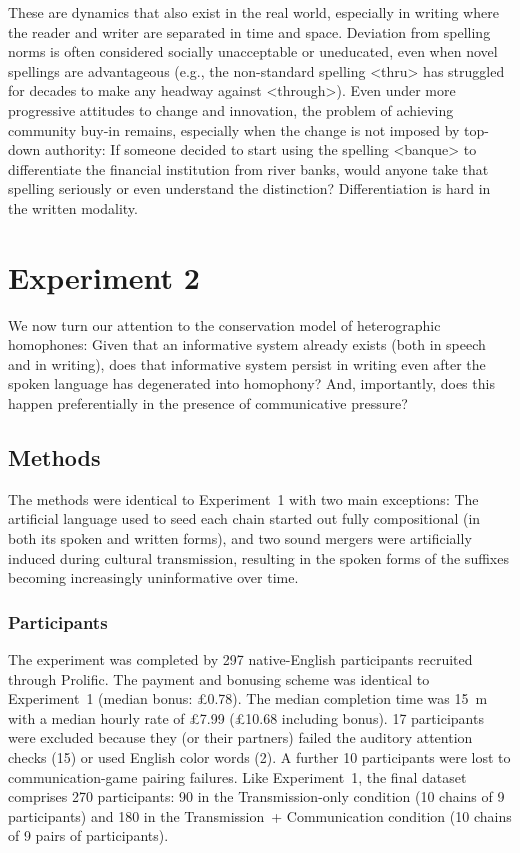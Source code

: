 \documentclass[doc,biblatex]{apa7}
\begin{document}
These are dynamics that also exist in the real world, especially in writing where the reader and writer are separated in time and space. Deviation from spelling norms is often considered socially unacceptable or uneducated, even when novel spellings are advantageous (e.g., the non-standard spelling <thru> has struggled for decades to make any headway against <through>). Even under more progressive attitudes to change and innovation, the problem of achieving community buy-in remains, especially when the change is not imposed by top-down authority: If someone decided to start using the spelling <banque> to differentiate the financial institution from river banks, would anyone take that spelling seriously or even understand the distinction? Differentiation is hard in the written modality.


\section{Experiment 2}

We now turn our attention to the conservation model of heterographic homophones: Given that an informative system already exists (both in speech and in writing), does that informative system persist in writing even after the spoken language has degenerated into homophony? And, importantly, does this happen preferentially in the presence of communicative pressure?

\subsection{Methods}

The methods were identical to Experiment~1 with two main exceptions: The artificial language used to seed each chain started out fully compositional (in both its spoken and written forms), and two sound mergers were artificially induced during cultural transmission, resulting in the spoken forms of the suffixes becoming increasingly uninformative over time.

\subsubsection{Participants}

The experiment was completed by 297 native-English participants recruited through Prolific. The payment and bonusing scheme was identical to Experiment~1 (median bonus: £0.78). The median completion time was 15~m with a median hourly rate of £7.99 (£10.68 including bonus). 17 participants were excluded because they (or their partners) failed the auditory attention checks (15) or used English color words (2). A further 10 participants were lost to communication-game pairing failures. Like Experiment~1, the final dataset comprises 270 participants: 90 in the Transmission-only condition (10 chains of 9 participants) and 180 in the Transmission~+ Communication condition (10 chains of 9 pairs of participants).
\end{document}
